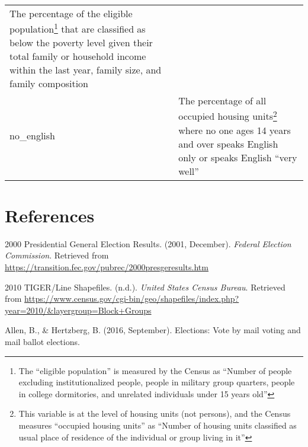 \documentclass[12pt,twoside]{reedthesis}
\begin{document}
\begin{longtable}[]{@{}ll@{}}
\begin{minipage}[t]{0.50\columnwidth}
The percentage of the eligible population\footnote{The ``eligible population'' is measured by the Census as ``Number of people excluding institutionalized people, people in military group quarters, people in college dormitories, and unrelated individuals under 15 years old''} that are classified as below the poverty level given their total family or household income within the last year, family size, and family composition\strut
\end{minipage}\tabularnewline
\begin{minipage}[t]{0.44\columnwidth}\raggedright
no\_english\strut
\end{minipage} & \begin{minipage}[t]{0.50\columnwidth}\raggedright
The percentage of all occupied housing units\footnote{This variable is at the level of housing units (not persons), and the Census measures ``occupied housing units'' as ``Number of housing units classified as usual place of residence of the individual or group living in it''} where no one ages 14 years and over speaks English only or speaks English ``very well''\strut
\end{minipage}\tabularnewline
\bottomrule
\end{longtable}
\backmatter

\hypertarget{references}{%
\chapter*{References}\label{references}}


\noindent

\setlength{\parindent}{-0.20in}
\setlength{\leftskip}{0.20in}
\setlength{\parskip}{8pt}

\hypertarget{refs}{}
\leavevmode\hypertarget{ref-noauthor_2000_2001}{}%
2000 Presidential General Election Results. (2001, December). \emph{Federal Election Commission}. Retrieved from \url{https://transition.fec.gov/pubrec/2000presgeresults.htm}

\leavevmode\hypertarget{ref-noauthor_2010_nodate}{}%
2010 TIGER/Line Shapefiles. (n.d.). \emph{United States Census Bureau}. Retrieved from \url{https://www.census.gov/cgi-bin/geo/shapefiles/index.php?year=2010/\&layergroup=Block+Groups}

\leavevmode\hypertarget{ref-allen_elections_2016}{}%
Allen, B., \& Hertzberg, B. (2016, September). Elections: Vote by mail voting and mail ballot elections.
\end{document}
